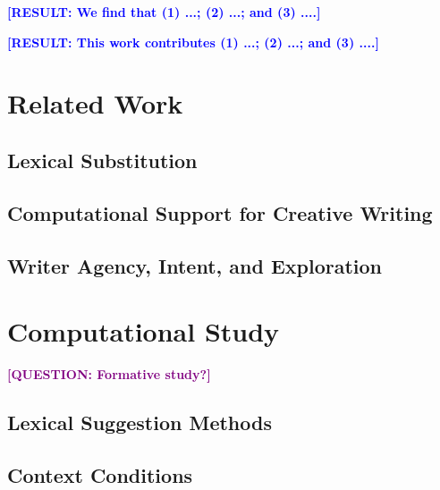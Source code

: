 \documentclass[sigconf,nonacm]{acmart}
\newcommand{\question}[1]{\textcolor{purple}{\textbf{[QUESTION: #1]}}}
\newcommand{\result}[1]{\textcolor{blue}{\textbf{[RESULT: #1]}}}
\begin{document}
\result{We find that (1) ...; (2) ...; and (3) ....}

\result{This work contributes (1) ...; (2) ...; and (3) ....}


\section{Related Work}

\subsection{Lexical Substitution}

\subsection{Computational Support for Creative Writing}

\subsection{Writer Agency, Intent, and Exploration}


\section{Computational Study}
\question{Formative study?}
\subsection{Lexical Suggestion Methods}

\subsection{Context Conditions}
\end{document}
